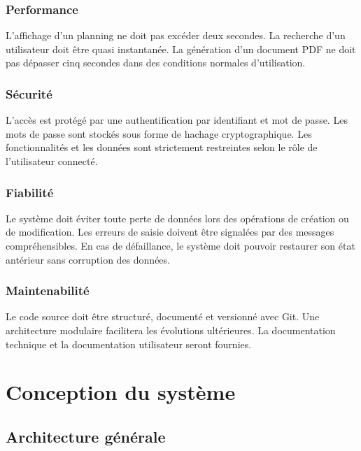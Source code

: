 \documentclass[12pt,a4paper]{article}
\begin{document}
\subsubsection{Performance}
L'affichage d'un planning ne doit pas excéder deux secondes. La recherche d'un
utilisateur doit être quasi instantanée. La génération d'un document PDF ne doit
pas dépasser cinq secondes dans des conditions normales d'utilisation.

\subsubsection{Sécurité}
L'accès est protégé par une authentification par identifiant et mot de passe. Les
mots de passe sont stockés sous forme de hachage cryptographique. Les
fonctionnalités et les données sont strictement restreintes selon le rôle de
l'utilisateur connecté.

\subsubsection{Fiabilité}
Le système doit éviter toute perte de données lors des opérations de création ou
de modification. Les erreurs de saisie doivent être signalées par des messages
compréhensibles. En cas de défaillance, le système doit pouvoir restaurer son
état antérieur sans corruption des données.

\subsubsection{Maintenabilité}
Le code source doit être structuré, documenté et versionné avec Git. Une
architecture modulaire facilitera les évolutions ultérieures. La documentation
technique et la documentation utilisateur seront fournies.

\section{Conception du système}
\label{sec:conception}

\subsection{Architecture générale}
\label{subsec:architecture}
\end{document}
